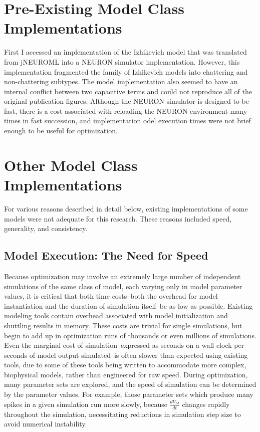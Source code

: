 
\section{Pre-Existing Model Class Implementations}
First I accessed an implementation of the Izhikevich model that was translated from jNEUROML into a NEURON simulator implementation.
However, this implementation fragmented the family of Izhikevich models into chattering and non-chattering subtypes.
The model implementation also seemed to have an internal conflict between two capacitive terms and could not reproduce all of the original publication figures.
Although the NEURON simulator is designed to be fast, there is a cost associated with reloading the NEURON environment many times in fast succession, and implementation odel execution times were not brief enough to be useful for optimization.

\section{Other Model Class Implementations}
For various reasons described in detail below, existing implementations of some models were not adequate for this research.
These reasons included speed, generality, and consistency.

\subsection{Model Execution: The Need for Speed}
Because optimization may involve an extremely large number of independent simulations of the same class of model, each varying only in model parameter values, it is critical that both time costs--both the overhead for model instantiation and the duration of simulation itself--be as low as possible.
Existing modeling tools contain overhead associated with model initialization and shuttling results in memory.
These costs are trivial for single simulations, but begin to add up in optimization runs of thousands or even millions of simulations.  
Even the marginal cost of simulation--expressed as seconds on a wall clock per seconds of model output simulated--is often slower than expected using existing tools, due to some of these tools being written to accommodate more complex, biophysical models, rather than engineered for raw speed.
During optimization, many parameter sets are explored, and the speed of  simulation can be determined by the parameter values.
For example, those parameter sets which produce many spikes in a given simulation run more slowly, because $\frac{dV_{M}}{dt}$ changes rapidly throughout the simulation, necessitating reductions in simulation step size to avoid numerical instability.

